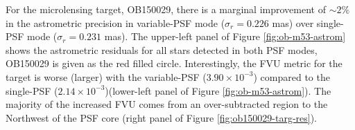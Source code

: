 \documentclass[]{spie}  %
\begin{document}
\indent For the microlensing target, OB150029, there is a marginal improvement of ${\sim}2\%$ in the astrometric precision in variable-PSF mode ($\sigma_{r}=0.226$ mas) over single-PSF mode ($\sigma_{r}=0.231$ mas). The upper-left panel of Figure \ref{fig:ob-m53-astrom} shows the astrometric residuals for all stars detected in both PSF modes, OB150029 is given as the red filled circle. Interestingly, the FVU metric for the target is worse (larger) with the variable-PSF ($3.90\times10^{-3}$) compared to the single-PSF ($2.14\times10^{-3}$)(lower-left panel of Figure \ref{fig:ob-m53-astrom}). 
The majority of the increased FVU comes from an over-subtracted region to the Northwest of the PSF core (right panel of Figure \ref{fig:ob150029-targ-res}).
\end{document}
